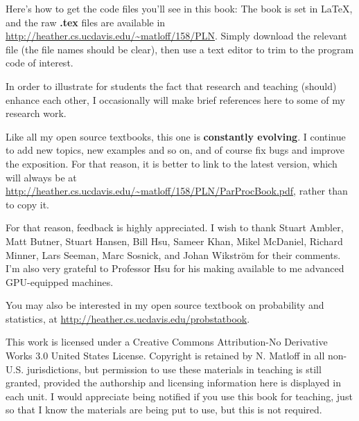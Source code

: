 Here's how to get the code files you'll see in this book: The book is
set in LaTeX, and the raw {\bf .tex} files are available in
\url{http://heather.cs.ucdavis.edu/~matloff/158/PLN}.  Simply download
the relevant file (the file names should be clear), then use a text
editor to trim to the program code of interest.

In order to illustrate for students the fact that research and teaching
(should) enhance each other, I occasionally will make brief references
here to some of my research work.

Like all my open source textbooks, this one is {\bf constantly
evolving}.  I continue to add new topics, new examples and so on, and of
course fix bugs and improve the exposition.  For that reason, it is
better to link to the latest version, which will always be at
\url{http://heather.cs.ucdavis.edu/~matloff/158/PLN/ParProcBook.pdf},
rather than to copy it.

For that reason, feedback is highly appreciated.  I wish to thank Stuart
Ambler, Matt Butner, Stuart Hansen, Bill Hsu, Sameer Khan, Mikel
McDaniel, Richard Minner, Lars Seeman, Marc Sosnick,
and Johan Wikstr{\"o}m for their
comments.  I'm also very grateful to Professor Hsu for his making
available to me advanced GPU-equipped machines.

You may also be interested in my open source textbook on probability and
statistics, at \url{http://heather.cs.ucdavis.edu/probstatbook}.

This work is licensed under a Creative Commons Attribution-No Derivative
Works 3.0 United States License. Copyright is retained by N. Matloff in
all non-U.S. jurisdictions, but permission to use these materials in
teaching is still granted, provided the authorship and licensing
information here is displayed in each unit. I would appreciate being
notified if you use this book for teaching, just so that I know the
materials are being put to use, but this is not required.

